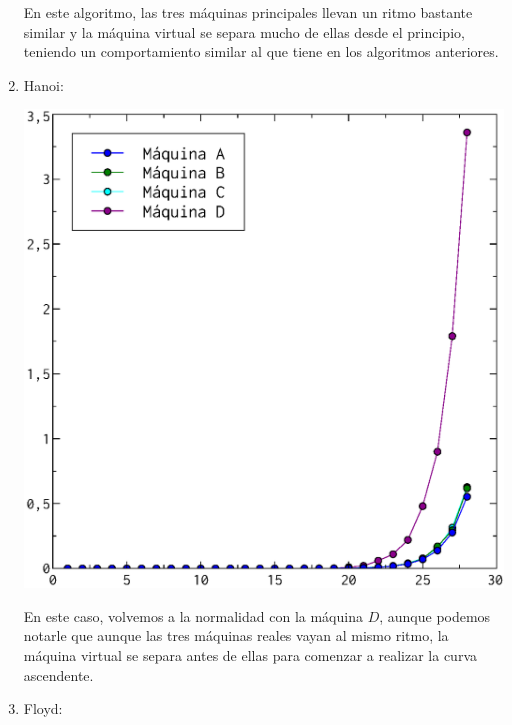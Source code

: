 \documentclass[a4paper, 11pt]{article}
\begin{document}
\begin{enumerate}
\begin{center}
    \end{center}
    En este algoritmo, las tres máquinas principales llevan un ritmo bastante similar y la máquina virtual se separa mucho de ellas desde el principio, teniendo un comportamiento similar al que tiene en los algoritmos anteriores.
  \item Hanoi:\\
    \begin{center}
      \includegraphics[scale=0.5]{hanoi_todos.eps}\\
    \end{center}
    En este caso, volvemos a la normalidad con la máquina $D$, aunque podemos notarle que aunque las tres máquinas reales vayan al mismo ritmo, la máquina virtual se separa antes de ellas para comenzar a realizar la curva ascendente.
  \item Floyd:\\
    \begin{center}

\end{center}
\end{enumerate}
\end{document}
